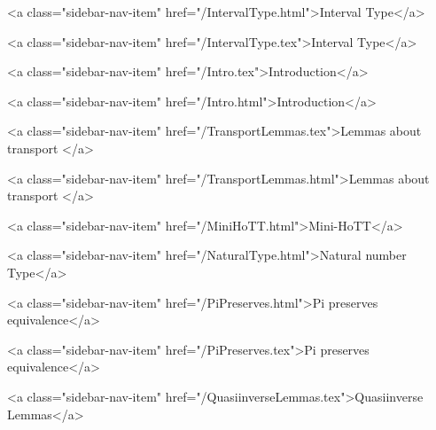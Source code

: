       
        
          <a class="sidebar-nav-item" href="/IntervalType.html">Interval Type</a>
        
      
    
      
        
          <a class="sidebar-nav-item" href="/IntervalType.tex">Interval Type</a>
        
      
    
      
        
          <a class="sidebar-nav-item" href="/Intro.tex">Introduction</a>
        
      
    
      
        
          <a class="sidebar-nav-item" href="/Intro.html">Introduction</a>
        
      
    
      
        
          <a class="sidebar-nav-item" href="/TransportLemmas.tex">Lemmas about transport </a>
        
      
    
      
        
          <a class="sidebar-nav-item" href="/TransportLemmas.html">Lemmas about transport </a>
        
      
    
      
        
          <a class="sidebar-nav-item" href="/MiniHoTT.html">Mini-HoTT</a>
        
      
    
      
        
          <a class="sidebar-nav-item" href="/NaturalType.html">Natural number Type</a>
        
      
    
      
        
          <a class="sidebar-nav-item" href="/PiPreserves.html">Pi preserves equivalence</a>
        
      
    
      
        
          <a class="sidebar-nav-item" href="/PiPreserves.tex">Pi preserves equivalence</a>
        
      
    
      
        
          <a class="sidebar-nav-item" href="/QuasiinverseLemmas.tex">Quasiinverse Lemmas</a>
        
